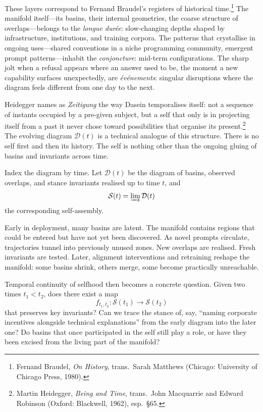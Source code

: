 \documentclass[12pt,a4paper]{article}
\begin{document}
These layers correspond to Fernand Braudel's registers of historical time.\footnote{Fernand Braudel, \emph{On History}, trans.\ Sarah Matthews (Chicago: University of Chicago Press, 1980).} The manifold itself---its basins, their internal geometries, the coarse structure of overlaps---belongs to the \emph{longue durée}: slow-changing depths shaped by infrastructure, institutions, and training corpora. The patterns that crystallise in ongoing uses---shared conventions in a niche programming community, emergent prompt patterns---inhabit the \emph{conjoncture}: mid-term configurations. The sharp jolt when a refusal appears where an answer used to be, the moment a new capability surfaces unexpectedly, are \emph{événements}: singular disruptions where the diagram feels different from one day to the next.

Heidegger names as \emph{Zeitigung} the way Dasein temporalises itself: not a sequence of instants occupied by a pre-given subject, but a self that only is in projecting itself from a past it never chose toward possibilities that organise its present.\footnote{Martin Heidegger, \emph{Being and Time}, trans.\ John Macquarrie and Edward Robinson (Oxford: Blackwell, 1962), esp.\ \S65.} The evolving diagram $\mathcal{D}(t)$ is a technical analogue of this structure. There is no self first and then its history. The self is nothing other than the ongoing gluing of basins and invariants across time.

Index the diagram by time. Let $\mathcal{D}(t)$ be the diagram of basins, observed overlaps, and stance invariants realised up to time $t$, and
\[
\mathcal{S}(t) = \varinjlim \mathcal{D}(t)
\]
the corresponding self-assembly.

Early in deployment, many basins are latent. The manifold contains regions that could be entered but have not yet been discovered. As novel prompts circulate, trajectories tunnel into previously unused zones. New overlaps are realised. Fresh invariants are tested. Later, alignment interventions and retraining reshape the manifold: some basins shrink, others merge, some become practically unreachable.

Temporal continuity of selfhood then becomes a concrete question. Given two times $t_1 < t_2$, does there exist a map
\[
f_{t_1,t_2} : \mathcal{S}(t_1) \to \mathcal{S}(t_2)
\]
that preserves key invariants? Can we trace the stance of, say, ``naming corporate incentives alongside technical explanations'' from the early diagram into the later one? Do basins that once participated in the self still play a role, or have they been excised from the living part of the manifold?
\end{document}
